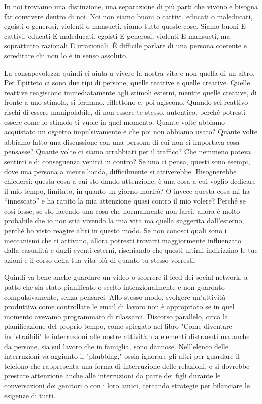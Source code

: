 \documentclass[12pt]{book} %
\begin{document}
In noi troviamo una distinzione, una separazione di più parti che vivono e bisogna far convivere dentro di
noi. Noi non siamo buoni o cattivi, educati o maleducati, egoisti o generosi, violenti o mansueti, siamo tutte queste
cose. Siamo buoni E cattivi, educati E maleducati, egoisti E generosi, violenti E mansueti, ma soprattutto razionali E
irrazionali. È difficile parlare di una persona coerente e screditare chi non lo è in senso assoluto.

La consapevolezza quindi ci aiuta a vivere la nostra vita e non quella di un altro.
Per Epitteto ci sono due tipi di persone, quelle reattive e quelle creative. Quelle reattive reagiscono immediatamente
agli stimoli esterni, mentre quelle creative, di fronte a uno stimolo, si fermano, riflettono e, poi agiscono. Quando
sei reattivo rischi di essere manipolabile, di non essere te stesso, autentico, perché potresti essere come lo stimolo ti vuole in quel momento. Quante volte abbiamo acquistato un oggetto impulsivamente e che poi non abbiamo usato? Quante volte
abbiamo fatto una discussione con una persona di cui non ci importava cosa pensasse? Quante volte ci siamo arrabbiati
per il traffico? Che nemmeno poteva sentirci e di conseguenza venirci in contro? Se uno ci pensa, questi sono esempi,
dove una persona a mente lucida, difficilmente si attiverebbe. Bisognerebbe chiedersi: questa cosa a cui sto dando
attenzione, è una cosa a cui voglio dedicare il mio tempo, limitato, in quanto un giorno morirò? O invece questa cosa
mi ha “innescato” e ha rapito la mia attenzione quasi contro il mio volere? Perché se così fosse, se sto facendo una
cosa che normalmente non farei, allora è molto probabile che io non stia vivendo la mia vita ma quella suggerita
dall'esterno, perché ho visto reagire altri in questo modo. Se non conosci quali sono i meccanismi che ti attivano, allora potresti trovarti maggiormente influenzato dalla casualità e dagli eventi esterni, rischiando che questi ultimi indirizzino le tue azioni e il corso della tua vita più di quanto tu stesso vorresti.

Quindi va bene anche guardare un video o scorrere il feed dei social network, a patto che sia stato pianificato o scelto intenzionalmente e non guardato compulsivamente, senza pensarci. Allo stesso modo, svolgere un’attività produttiva come controllare le email di lavoro non è appropriato se in quel momento avevamo programmato di rilassarci. Discorso parallelo, circa la pianificazione del proprio tempo, come spiegato nel libro "Come diventare indistraibili"  le interruzioni alle nostre attività, da elementi distraenti ma anche da persone, sia sul lavoro che in famiglia, sono dannose. Nell'elenco delle interruzioni va aggiunto il "phubbing," ossia ignorare gli altri per guardare il telefono che rappresenta una forma di interruzione delle relazioni, e si dovrebbe prestare attenzione anche alle interruzioni da parte dei figli durante le conversazioni dei genitori o con i loro amici, cercando strategie per bilanciare le esigenze di tutti.
\end{document}
